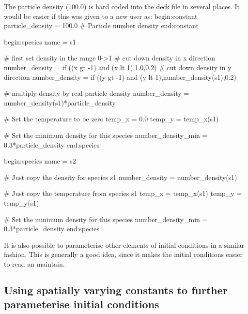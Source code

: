 \documentclass[12pt,a4paper]{article}
\newenvironment{boxverbatim}{\lboxverbatim{none}}{\endlboxverbatim}
\begin{document}
The particle density (100.0) is hard coded into the deck file in several
places. It would be easier if this was given to a new user as:
\begin{boxverbatim}
begin:constant
   particle_density = 100.0 # Particle number density
end:constant

begin:species
   name = s1

   # first set density in the range 0->1
   # cut down density in x direction
   number_density = if ((x gt -1) and (x lt 1),1.0,0.2)
   # cut down density in y direction
   number_density = if ((y gt -1) and (y lt 1),number_density(s1),0.2)

   # multiply density by real particle density
   number_density = number_density(s1)*particle_density

   # Set the temperature to be zero
   temp_x = 0.0
   temp_y = temp_x(s1)

   # Set the minimum density for this species
   number_density_min = 0.3*particle_density
end:species

begin:species
   name = s2

   # Just copy the density for species s1
   number_density = number_density(s1)

   # Just copy the temperature from species s1
   temp_x = temp_x(s1)
   temp_y = temp_y(s1)

   # Set the minimum density for this species
   number_density_min = 0.3*particle_density
end:species
\end{boxverbatim}

It is also possible to parameterise other elements of initial conditions in a
similar fashion. This is generally a good idea, since it makes the
initial conditions easier to read an maintain.

\subsection{Using spatially varying constants to further parameterise
  initial conditions}
\end{document}
